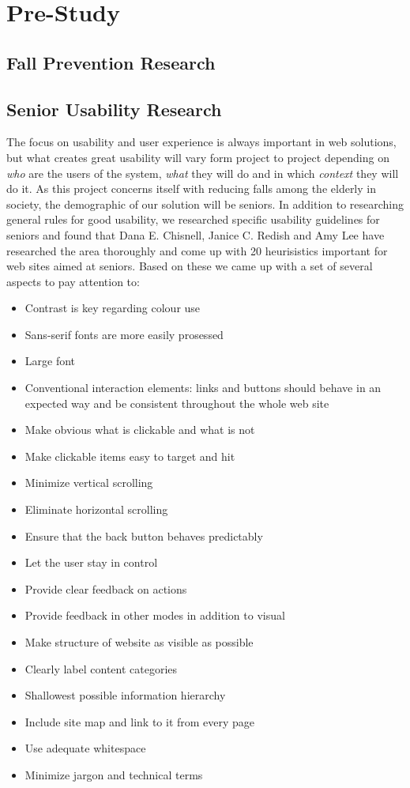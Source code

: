 \chapter{Pre-Study}
\section{Fall Prevention Research}
\section{Senior Usability Research}
The focus on usability and user experience is always important in web solutions, but what creates great usability will vary form project to project depending on \textit{who} are the users of the system, \textit{what} they will do and in which \textit{context} they will do it. As this project concerns itself with reducing falls among the elderly in society, the demographic of our solution will be seniors. In addition to researching general rules for good usability, we researched specific usability guidelines for seniors and found that Dana E. Chisnell, Janice C. Redish and Amy Lee \cite{heuristics} have researched the area thoroughly and come up with 20 heurisistics important for web sites aimed at seniors. Based on these we came up with a set of several aspects to pay attention to: 
\begin{itemize}
  \item Contrast is key regarding colour use
  \item Sans-serif fonts are more easily prosessed
  \item Large font
  \item Conventional interaction elements: links and buttons should behave in an expected way and be consistent throughout the whole web site
  \item Make obvious what is clickable and what is not
  \item Make clickable items easy to target and hit
  \item Minimize vertical scrolling
  \item Eliminate horizontal scrolling
  \item Ensure that the back button behaves predictably
  \item Let the user stay in control
  \item Provide clear feedback on actions
  \item Provide feedback in other modes in addition to visual
  \item Make structure of website as visible as possible
  \item Clearly label content categories
  \item Shallowest possible information hierarchy
  \item Include site map and link to it from every page
  \item Use adequate whitespace
  \item Minimize jargon and technical terms
  
\end{itemize}
